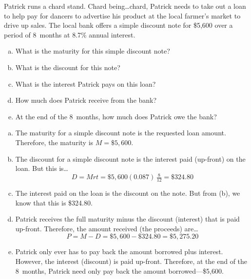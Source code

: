 \documentclass[11pt,letterpaper]{article}
\begin{document}
\newpage



 Patrick runs a chard stand. Chard being\dots chard, Patrick needs to take out a loan to help pay for dancers to advertise his product at the local farmer's market to drive up sales. The local bank offers a simple discount note for \$5,600 over a period of 8~months at 8.7\% annual interest. 
	\begin{enumerate}[(a)]
	\item What is the maturity for this simple discount note?
	\item What is the discount for this note?
	\item What is the interest Patrick pays on this loan?
	\item How much does Patrick receive from the bank?
	\item At the end of the 8~months, how much does Patrick owe the bank?
	\end{enumerate} \pspace

\sol 
\begin{enumerate}[(a)]
\item The maturity for a simple discount note is the requested loan amount. Therefore, the maturity is $M= \$5,\!600$. \pspace

\item The discount for a simple discount note is the interest paid (up-front) on the loan. But this is\dots
	\[
	D= Mrt= \$5,\!600 (0.087)\, \tfrac{8}{12}= \$324.80
	\] 

\item The interest paid on the loan is the discount on the note. But from (b), we know that this is \$324.80. \pspace

\item Patrick receives the full maturity minus the discount (interest) that is paid up-front. Therefore, the amount received (the proceeds) are\dots
	\[
	P= M - D= \$5,\!600 - \$324.80= \$5,\!275.20
	\]

\item Patrick only ever has to pay back the amount borrowed plus interest. However, the interest (discount) is paid up-front. Therefore, at the end of the 8~months, Patrick need only pay back the amount borrowed---\$5,600. 
\end{enumerate}
\end{document}
